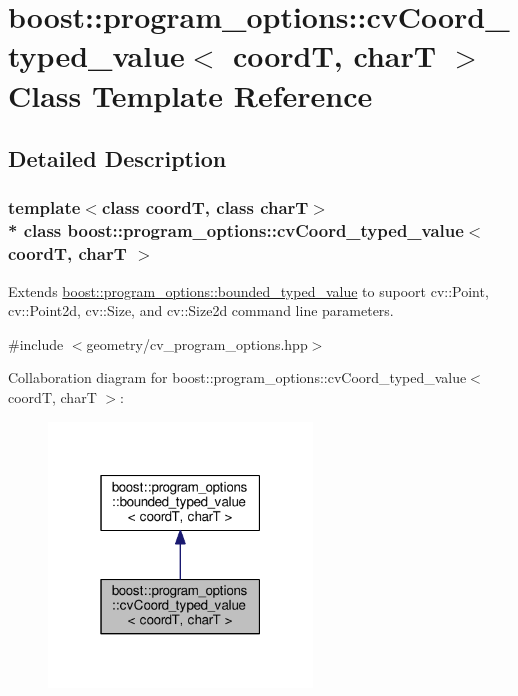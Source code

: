 \hypertarget{structboost_1_1program__options_1_1cv_coord__typed__value}{}\section{boost\+:\+:program\+\_\+options\+:\+:cv\+Coord\+\_\+typed\+\_\+value$<$ coordT, charT $>$ Class Template Reference}
\label{structboost_1_1program__options_1_1cv_coord__typed__value}


\subsection{Detailed Description}
\subsubsection*{template$<$class coordT, class charT$>$\\*
class boost\+::program\+\_\+options\+::cv\+Coord\+\_\+typed\+\_\+value$<$ coord\+T, char\+T $>$}

Extends \hyperlink{classboost_1_1program__options_1_1bounded__typed__value}{boost\+::program\+\_\+options\+::bounded\+\_\+typed\+\_\+value} to supoort cv\+::\+Point, cv\+::\+Point2d, cv\+::\+Size, and cv\+::\+Size2d command line parameters. 

{\ttfamily \#include $<$geometry/cv\+\_\+program\+\_\+options.\+hpp$>$}



Collaboration diagram for boost\+:\+:program\+\_\+options\+:\+:cv\+Coord\+\_\+typed\+\_\+value$<$ coordT, charT $>$\+:
\nopagebreak
\begin{figure}[H]
\begin{center}
\leavevmode
\includegraphics[width=199pt]{structboost_1_1program__options_1_1cv_coord__typed__value__coll__graph}
\end{center}
\end{figure}
